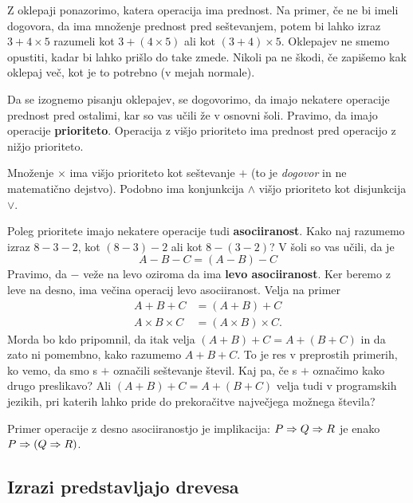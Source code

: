 Z oklepaji ponazorimo, katera operacija ima prednost. Na primer, če ne bi imeli dogovora, da ima množenje prednost pred
seštevanjem, potem bi lahko izraz $3 + 4 \times 5$ razumeli kot $3 + (4 \times 5)$ ali kot $(3 + 4) \times 5$. Oklepajev ne smemo opustiti, kadar bi lahko prišlo do take zmede. Nikoli pa ne škodi, če zapišemo kak oklepaj več, kot je to potrebno (v mejah normale).

Da se izognemo pisanju oklepajev, se dogovorimo, da imajo nekatere operacije prednost pred ostalimi, kar so vas učili že
v osnovni šoli. Pravimo, da imajo operacije \textbf{prioriteto}. Operacija z višjo prioriteto ima prednost pred operacijo z
nižjo prioriteto.

\begin{zgled}
  Množenje $\times$ ima višjo prioriteto kot seštevanje $+$ (to je \emph{dogovor} in ne matematično dejstvo).
  Podobno ima konjunkcija $\land$ višjo prioriteto kot disjunkcija $\lor$.
\end{zgled}

Poleg prioritete imajo nekatere operacije tudi \textbf{asociiranost}. Kako naj razumemo izraz $8 - 3 - 2$, kot $(8 - 3) - 2$
ali kot $8 - (3 - 2)$? V šoli so vas učili, da je
%
\begin{equation*}
  A - B - C = (A - B) - C
\end{equation*}
%
Pravimo, da $-$ veže na levo oziroma da ima \textbf{levo asociiranost}. Ker beremo z leve na desno, ima večina operacij levo
asociiranost. Velja na primer
%
\begin{align*}
  A + B + C &= (A + B) + C \\
  A \times B \times C &= (A \times B) \times C.
\end{align*}
%
Morda bo kdo pripomnil, da itak velja $(A + B) + C = A + (B + C)$ in da zato ni pomembno, kako razumemo $A + B + C$. To je
res v preprostih primerih, ko vemo, da smo s $+$ označili seštevanje števil. Kaj pa, če s $+$ označimo kako drugo
preslikavo? Ali $(A + B) + C = A + (B + C)$ velja tudi v programskih jezikih, pri katerih lahko pride do prekoračitve
največjega možnega števila?

Primer operacije z desno asociiranostjo je implikacija: $P \Rightarrow Q \Rightarrow R$ je enako $P \Rightarrow (Q \Rightarrow R)$.


\subsection{Izrazi predstavljajo drevesa}

